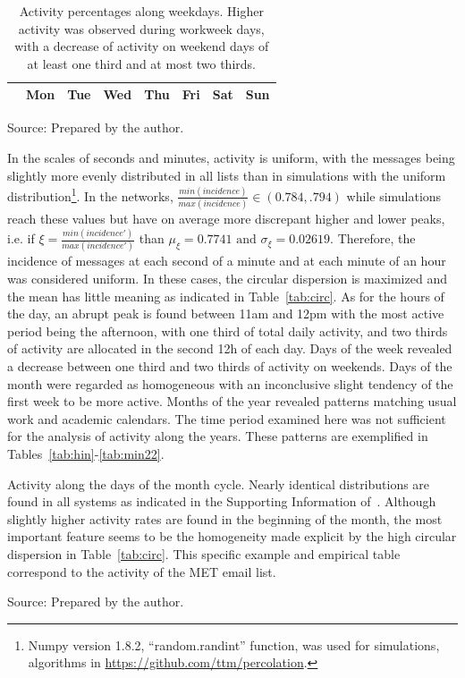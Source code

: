 \begin{table}
\caption{Activity percentages along weekdays.
Higher activity was observed during workweek days, with a decrease of activity on weekend days of at least one third and at most two thirds.}
\begin{center}
\begin{tabular}{ | l ||  c | c | c | c | c |c | c |}
\hline
& Mon & Tue & Wed & Thu & Fri & Sat & Sun  \\ \hline

\end{tabular}
\end{center}
\label{tab:win}
\begin{flushleft}
Source: Prepared by the author.\
\end{flushleft}
\end{table}

In the scales of seconds and minutes, activity is uniform,
with the messages being slightly more evenly distributed in all lists than in simulations with the uniform distribution\footnote{Numpy version 1.8.2, ``random.randint'' function, was used for simulations, algorithms in \url{https://github.com/ttm/percolation}.}.
In the networks, $\frac{min(incidence)}{max(incidence)} \in (0.784,.794)$ while simulations reach these values but have on average more discrepant higher and lower peaks, i.e. if $\xi=\frac{min(incidence')}{max(incidence')}$ than $\mu_\xi=0.7741 \text{ and } \sigma_\xi=0.02619$.
Therefore, the incidence of messages at each second of a minute and at each minute of an hour was considered uniform.
In these cases, the circular dispersion is maximized and the mean has little meaning as indicated in Table~\ref{tab:circ}.
As for the hours of the day, an abrupt peak is found between 11am and 12pm with the most active period being the afternoon, with one third of total daily activity, and two thirds of activity are allocated in the second 12h of each day. Days of the week revealed a decrease between one third and two thirds of activity on weekends.
Days of the month were regarded as homogeneous with an inconclusive slight tendency of the first week to be more active.
Months of the year revealed patterns matching usual work and academic calendars. The time period examined here was not sufficient for the analysis of activity along the years. These patterns are exemplified in Tables~\ref{tab:hin}-\ref{tab:min22}.


\FloatBarrier

\begin{table}
\caption{Activity along the days of the month cycle.
Nearly identical distributions are found in all systems
as indicated in the Supporting Information of~\cite{stab}. Although slightly higher activity rates are found in the beginning of the month, the most important feature seems to be the homogeneity made explicit by the high circular dispersion in Table~\ref{tab:circ}.
This specific example and empirical table correspond to the activity of the MET email list.}
\footnotesize

\label{tab:min}
\begin{flushleft}
Source: Prepared by the author.\
\end{flushleft}
\end{table}

